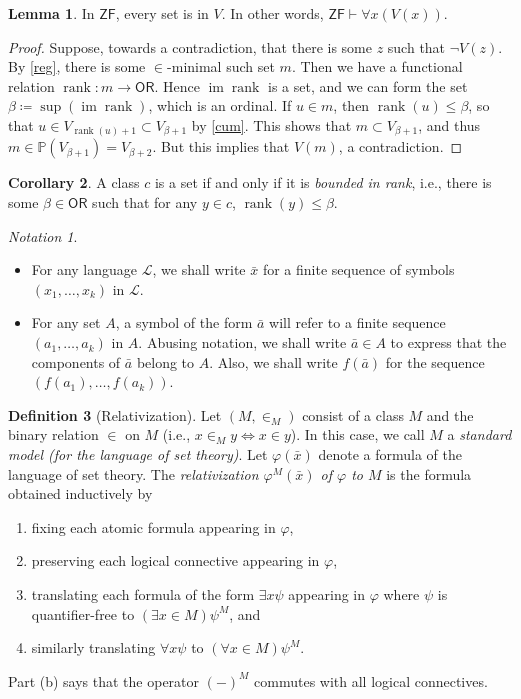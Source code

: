 \documentclass[10pt,letterpaper,cm]{nupset}
\theoremstyle{definition}
\newtheorem{definition}{Definition}[subsection]
\theoremstyle{theorem}
\newtheorem{lemma}[definition]{Lemma}
\newtheorem{corollary}[definition]{Corollary}
\theoremstyle{remark}
\newtheorem*{notation}{Notation}
\renewcommand{\L}{\mathcal L}
\renewcommand{\P}{\mathbb P}
\newcommand{\1}{\mathbf{1}}
\newcommand{\0}{\vec 0}
\newcommand{\zf}{\mathsf{ZF}}
\newcommand{\ord}{\mathsf{OR}}
\DeclareMathOperator{\im}{im}
\DeclareMathOperator{\rnk}{rank}
\newcommand{\bi}{\begin{itemize}}
\newcommand{\ei}{\end{itemize}}
\newcommand{\be}{\begin{enumerate}}
\newcommand{\ee}{\end{enumerate}}
\begin{document}
\begin{lemma}
In $\zf$, every set is in $V$. In other words, $\zf \vdash \forall x(V(x))$.
\end{lemma}
\begin{proof}
Suppose, towards a contradiction, that there is some $z$ such that $\neg{V(z)}$. By \cref{reg}, there is some $\in$-minimal such set $m$. Then we have a functional relation $\rnk :  m \to \ord$. Hence $\im{\rnk}$ is a set, and we can form the set $\beta \coloneqq \sup(\im{\rnk})$, which is an ordinal. If $u \in m$, then $\rnk(u) \leq \beta$, so that $u \in V_{\rnk(u)+1} \subset V_{\beta +1}$ by \cref{cum}. This shows that $m\subset  V_{\beta +1}$, and thus $m \in \P(V_{\beta +1}) = V_{\beta +2}$. But this implies that $V(m)$, a contradiction. 
\end{proof}

\begin{corollary}
A class $c$ is a set if and only if it is \textit{bounded in rank}, i.e., there is some $\beta \in \ord$ such that for any $y\in c$, $\rnk(y) \leq \beta$.
\end{corollary}

\begin{notation} $ $
\bi
\item For any language $\L$, we shall write $\bar{x}$ for a finite sequence of symbols $(x_1, \ldots, x_k)$ in $\L$.  
\item For any set $A$, a symbol of the form $\bar{a}$ will refer to a finite sequence $(a_1, \ldots, a_k)$  in $A$. Abusing notation, we shall  write $\bar{a} \in A$ to express that the components of $\bar{a}$ belong to $A$. Also, we shall write $f(\bar{a})$ for the sequence $(f(a_1), \ldots, f(a_k))$.
\ei
\end{notation}

\begin{definition}[Relativization]
Let $(M, \in_M)$ consist of a class $M$ and the binary relation $\in$ on $M$ (i.e., $x \in_M y \iff x\in y$). In this case, we call $M$ a \textit{standard model (for the language of set theory)}. Let $\varphi(\bar{x})$ denote a formula of the language of set theory. The \textit{relativization $\varphi^M(\bar{x})$ of $\varphi$ to $M$} is the formula obtained inductively  by 
\be[label=(\alph*)]
\item  fixing each atomic formula appearing in $\varphi$,
\item preserving each logical connective  appearing in $\varphi$,
\item translating each formula of the form $\exists x \psi$ appearing in $\varphi$ where $\psi$ is quantifier-free  to $(\exists x \in M )\psi^M$, and 
\item similarly translating $\forall x \psi$  to $(\forall x \in M)\psi^M$.
\ee Part (b) says that the operator $({-})^M$ commutes with all logical connectives. 
\end{definition}
\end{document}
